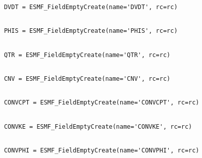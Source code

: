 
 \begin{verbatim}
      DVDT = ESMF_FieldEmptyCreate(name='DVDT', rc=rc)
 
\end{verbatim}
 

 \begin{verbatim}
      PHIS = ESMF_FieldEmptyCreate(name='PHIS', rc=rc)
 
\end{verbatim}
 

 \begin{verbatim}
      QTR = ESMF_FieldEmptyCreate(name='QTR', rc=rc)
 
\end{verbatim}
 

 \begin{verbatim}
      CNV = ESMF_FieldEmptyCreate(name='CNV', rc=rc)
 
\end{verbatim}
 

 \begin{verbatim}
      CONVCPT = ESMF_FieldEmptyCreate(name='CONVCPT', rc=rc)
 
\end{verbatim}
 

 \begin{verbatim}
      CONVKE = ESMF_FieldEmptyCreate(name='CONVKE', rc=rc)
 
\end{verbatim}
 

 \begin{verbatim}
      CONVPHI = ESMF_FieldEmptyCreate(name='CONVPHI', rc=rc)
 
\end{verbatim}
 

